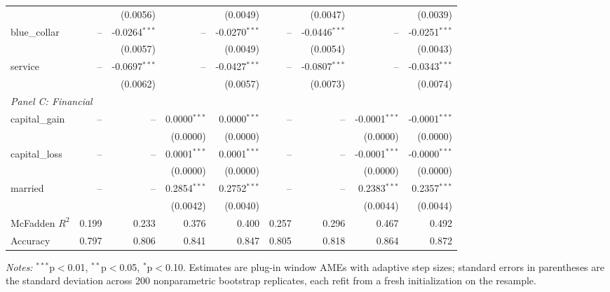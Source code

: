 \begin{table}[htbp]
\begin{threeparttable}
\begin{tabular}{lrrrrrrrr}
 &  & (0.0056) &  & (0.0049) &  & (0.0047) &  & (0.0039) \\
\quad blue\_collar & -- & -0.0264$^{***}$ & -- & -0.0270$^{***}$ & -- & -0.0446$^{***}$ & -- & -0.0251$^{***}$ \\
 &  & (0.0057) &  & (0.0049) &  & (0.0054) &  & (0.0043) \\
\quad service & -- & -0.0697$^{***}$ & -- & -0.0427$^{***}$ & -- & -0.0807$^{***}$ & -- & -0.0343$^{***}$ \\
 &  & (0.0062) &  & (0.0057) &  & (0.0073) &  & (0.0074) \\
\midrule
\multicolumn{9}{l}{\textit{Panel C: Financial}} \\
\quad capital\_gain & -- & -- & 0.0000$^{***}$ & 0.0000$^{***}$ & -- & -- & -0.0001$^{***}$ & -0.0001$^{***}$ \\
 &  &  & (0.0000) & (0.0000) &  &  & (0.0000) & (0.0000) \\
\quad capital\_loss & -- & -- & 0.0001$^{***}$ & 0.0001$^{***}$ & -- & -- & -0.0001$^{***}$ & -0.0000$^{***}$ \\
 &  &  & (0.0000) & (0.0000) &  &  & (0.0000) & (0.0000) \\
\quad married & -- & -- & 0.2854$^{***}$ & 0.2752$^{***}$ & -- & -- & 0.2383$^{***}$ & 0.2357$^{***}$ \\
 &  &  & (0.0042) & (0.0040) &  &  & (0.0044) & (0.0044) \\
\midrule
McFadden $R^2$ & 0.199 & 0.233 & 0.376 & 0.400 & 0.257 & 0.296 & 0.467 & 0.492 \\
Accuracy & 0.797 & 0.806 & 0.841 & 0.847 & 0.805 & 0.818 & 0.864 & 0.872 \\
\bottomrule
\end{tabular}
\begin{tablenotes}
\footnotesize
\item \textit{Notes:} $^{***}$p$<$0.01, $^{**}$p$<$0.05, $^{*}$p$<$0.10. Estimates are plug-in window AMEs with adaptive step sizes; standard errors in parentheses are the standard deviation across 200 nonparametric bootstrap replicates, each refit from a fresh initialization on the resample.
\end{tablenotes}
\end{threeparttable}
\end{table}